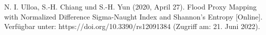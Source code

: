 \begin{thebibliography}{1}
N. I. Ulloa, S.-H. Chiang und S.-H. Yun (2020, April 27). Flood Proxy Mapping with Normalized Difference Sigma-Naught Index and Shannon’s Entropy [Online]. Verfügbar unter: 
https://doi.org/10.3390/rs12091384 
(Zugriff am: 21. Juni 2022).



























\end{thebibliography}
